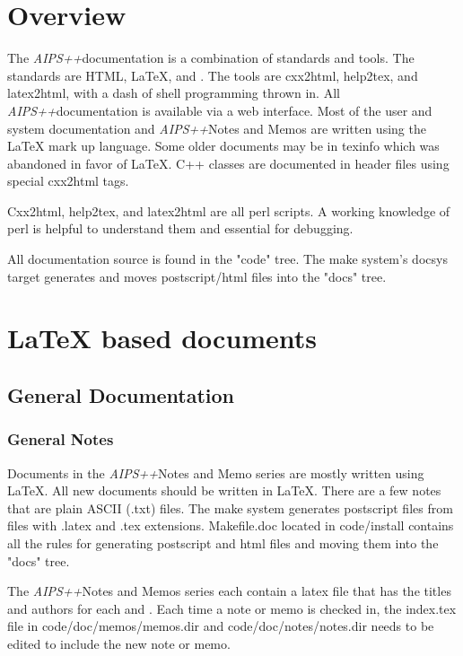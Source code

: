 \newcommand{\aips}{\textit{AIPS++}}
\section{Overview}
The \aips documentation is a combination of standards and tools.
The standards are HTML, LaTeX, and \htmladdnormallink{\aips guidelines}{}. 
The tools are cxx2html, help2tex, and
latex2html, with a dash of shell programming thrown in.
All \aips documentation is available via a web interface.  
Most of the user and system
documentation and \aips Notes and Memos are written using the LaTeX
mark up language. Some older documents may be in texinfo which was abandoned
in favor of LaTeX. C++ classes are documented in header files using 
special cxx2html tags.

Cxx2html, help2tex, and latex2html are all perl scripts. 
A working knowledge of perl is helpful to understand them and essential for 
debugging.

All documentation source is found in the "code" tree.  The make system's docsys
target generates and moves postscript/html files into the "docs" tree.

\section{LaTeX based documents}
\subsection{General Documentation}
\subsubsection{General Notes}
Documents in the \aips Notes and Memo series are mostly written using LaTeX.
All new documents should be written in LaTeX.
There are a few notes that are plain ASCII (.txt) files.  The make system
generates postscript
files from files with .latex and .tex extensions.  Makefile.doc located in
code/install contains all the rules for generating postscript and html files
and moving them into the "docs" tree.

The \aips Notes and Memos series each contain a latex file that has the titles
and authors for each  and 
.  Each time a note or memo
is checked in, the index.tex file in code/doc/memos/memos.dir and
code/doc/notes/notes.dir needs to be edited to include the new note or memo.

